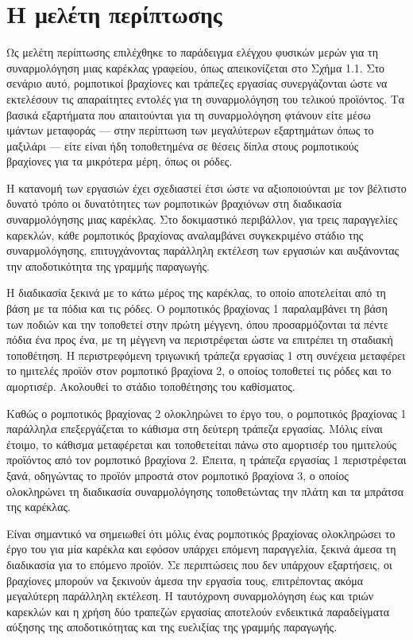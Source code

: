 \section{Η μελέτη περίπτωσης}
Ως μελέτη περίπτωσης επιλέχθηκε το παράδειγμα ελέγχου φυσικών μερών για τη συναρμολόγηση μιας καρέκλας γραφείου, όπως απεικονίζεται στο Σχήμα 1.1. Στο σενάριο αυτό, ρομποτικοί βραχίονες και τράπεζες εργασίας συνεργάζονται ώστε να εκτελέσουν τις απαραίτητες εντολές για τη συναρμολόγηση του τελικού προϊόντος. Τα βασικά εξαρτήματα που απαιτούνται για τη συναρμολόγηση φτάνουν είτε μέσω ιμάντων μεταφοράς — στην περίπτωση των μεγαλύτερων εξαρτημάτων όπως το μαξιλάρι — είτε είναι ήδη τοποθετημένα σε θέσεις δίπλα στους ρομποτικούς βραχίονες για τα μικρότερα μέρη, όπως οι ρόδες.

Η κατανομή των εργασιών έχει σχεδιαστεί έτσι ώστε να αξιοποιούνται με τον βέλτιστο δυνατό τρόπο οι δυνατότητες των ρομποτικών βραχιόνων στη διαδικασία συναρμολόγησης μιας καρέκλας. Στο δοκιμαστικό περιβάλλον, για τρεις παραγγελίες καρεκλών, κάθε ρομποτικός βραχίονας αναλαμβάνει συγκεκριμένο στάδιο της συναρμολόγησης, επιτυγχάνοντας παράλληλη εκτέλεση των εργασιών και αυξάνοντας την αποδοτικότητα της γραμμής παραγωγής.

Η διαδικασία ξεκινά με το κάτω μέρος της καρέκλας, το οποίο αποτελείται από τη βάση με τα πόδια και τις ρόδες. Ο ρομποτικός βραχίονας 1 παραλαμβάνει τη βάση των ποδιών και την τοποθετεί στην πρώτη μέγγενη, όπου προσαρμόζονται τα πέντε πόδια ένα προς ένα, με τη μέγγενη να περιστρέφεται ώστε να επιτρέπει τη σταδιακή τοποθέτηση. Η περιστρεφόμενη τριγωνική τράπεζα εργασίας 1 στη συνέχεια μεταφέρει το ημιτελές προϊόν στον ρομποτικό βραχίονα 2, ο οποίος τοποθετεί τις ρόδες και το αμορτισέρ. Ακολουθεί το στάδιο τοποθέτησης του καθίσματος.

Καθώς ο ρομποτικός βραχίονας 2 ολοκληρώνει το έργο του, ο ρομποτικός βραχίονας 1 παράλληλα επεξεργάζεται το κάθισμα στη δεύτερη τράπεζα εργασίας. Μόλις είναι έτοιμο, το κάθισμα μεταφέρεται και τοποθετείται πάνω στο αμορτισέρ του ημιτελούς προϊόντος από τον ρομποτικό βραχίονα 2. Έπειτα, η τράπεζα εργασίας 1 περιστρέφεται ξανά, οδηγώντας το προϊόν μπροστά στον ρομποτικό βραχίονα 3, ο οποίος ολοκληρώνει τη διαδικασία συναρμολόγησης τοποθετώντας την πλάτη και τα μπράτσα της καρέκλας.

Είναι σημαντικό να σημειωθεί ότι μόλις ένας ρομποτικός βραχίονας ολοκληρώσει το έργο του για μία καρέκλα και εφόσον υπάρχει επόμενη παραγγελία, ξεκινά άμεσα τη διαδικασία για το επόμενο προϊόν. Σε περιπτώσεις που δεν υπάρχουν εξαρτήσεις, οι βραχίονες μπορούν να ξεκινούν άμεσα την εργασία τους, επιτρέποντας ακόμα μεγαλύτερη παράλληλη εκτέλεση. Η ταυτόχρονη συναρμολόγηση έως και τριών καρεκλών και η χρήση δύο τραπεζών εργασίας αποτελούν ενδεικτικά παραδείγματα αύξησης της αποδοτικότητας και της ευελιξίας της γραμμής παραγωγής.

